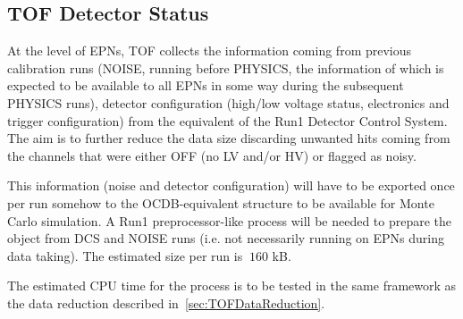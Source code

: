 \subsection{TOF Detector Status}
\label{sec:TOFDetectorStatus}
At the level of EPNs, TOF collects the information coming from previous calibration runs (NOISE, running before
PHYSICS, the information of which is expected to be available to all EPNs in some way during the subsequent
PHYSICS runs), detector configuration (high/low voltage status, electronics and trigger configuration) from the
equivalent of the Run1 Detector Control System. The aim is to further reduce the data size discarding 
unwanted hits coming from the channels that were either OFF (no LV and/or HV) or flagged as noisy. 

This information (noise and detector configuration) will have to be exported once per run somehow to the 
OCDB-equivalent structure to be available for Monte Carlo simulation. A Run1 preprocessor-like process will be needed to 
prepare the object from DCS and NOISE runs (i.e. not necessarily running on EPNs during data taking). The 
estimated size per run is $~160$ kB.

The estimated CPU time for the process is to be tested in the same framework as the data reduction described
in~\ref{sec:TOFDataReduction}.